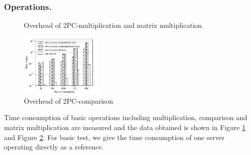 \documentclass[letterpaper]{article} %
\begin{document}
    \subsubsection{Operations.}
    \begin{figure}[htbp]
        \caption{Overhead of 2PC-multiplication and matrix multiplication}
        \label{multiplication and matrix multiplication}
    \end{figure}
    \begin{figure}[htbp]
        \centering
        \includegraphics[width=4cm]{operation_compare.pdf}
        \caption{Overhead of 2PC-comparison}
        \label{operation_compare}
    \end{figure}
    Time consumption of basic operations including multiplication, comparison and matrix multiplication are measured
    and the data obtained is shown in Figure \ref{multiplication and matrix multiplication} and Figure \ref{operation_compare}.
    For basic test, we give the time consumption of one server operating directly as a reference.
\end{document}
